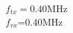 \documentclass[preview]{standalone}
\begin{document}
\begin{center}
$f_{tx}=$0.40MHz\\$f_{rx}$=0.40MHz
\end{center}
\end{document}
